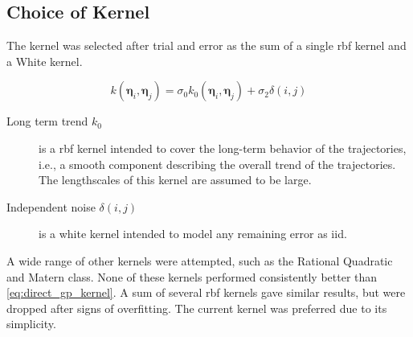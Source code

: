 \subsection{Choice of Kernel}
The kernel was selected after trial and error as the sum of a single \acrshort{rbf} kernel and a White kernel.

\begin{equation}\label{eq:direct_gp_kernel}
    k(\boldsymbol{\eta}_i, \boldsymbol{\eta}_j) = \sigma_0 k_0(\boldsymbol{\eta}_i, \boldsymbol{\eta}_j) + \sigma_2 \delta(i, j)
\end{equation}

\begin{description}
    \item[Long term trend $k_0$] is a \acrshort{rbf} kernel intended to cover the long-term behavior of the trajectories, i.e., a smooth component describing the overall trend of the trajectories. The lengthscales of this kernel are assumed to be large.
    \item[Independent noise $\delta(i, j)$] is a white kernel intended to model any remaining error as \acrshort{iid}.
\end{description} 

A wide range of other kernels were attempted, such as the Rational Quadratic and Matern class. None of these kernels performed consistently better than \cref{eq:direct_gp_kernel}. A sum of several \acrshort{rbf} kernels gave similar results, but were dropped after signs of overfitting. The current kernel was preferred due to its simplicity. 









